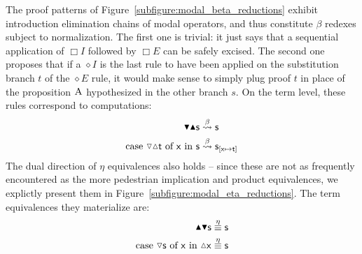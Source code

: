 The proof patterns of Figure~\ref{subfigure:modal_beta_reductions} exhibit introduction elimination chains of modal operators, and thus constitute $\beta$ redexes subject to normalization.
The first one is trivial: it just says that a sequential application of $\Box I$ followed by $\Box E$ can be safely excised.
The second one proposes that if a $\diamond I$ is the last rule to have been applied on the substitution branch $t$ of the $\diamond E$ rule, it would make sense to simply plug proof $t$ in place of the proposition $\smallprop{A}$ hypothesized in the other  branch $s$.
On the term level, these rules correspond to computations:
\begin{align*}
\boxelim \boxintro \term{s} & \overset{\beta}{\leadsto} \term{s}\\
\cterm{case \term{\diaelim \diaintro t} of \term{x} in \term{s}} & \overset{\beta}{\leadsto} \term{s}_{[\term{x} \mapsto \term{t}]}
\end{align*}
The dual direction of $\eta$ equivalences also holds -- since these are not as frequently encountered as the more pedestrian implication and product equivalences, we explictly present them in Figure~\ref{subfigure:modal_eta_reductions}.
The term equivalences they materialize are:
\begin{align*}
\boxintro \boxelim \term{s} & \overset{\eta}{\equiv} \term{s}\\
\cterm{case \term{\diaelim{s}} of \term{x} in \term{\diaintro{x}}} & \overset{\eta}{\equiv} \term{s}
\end{align*}

